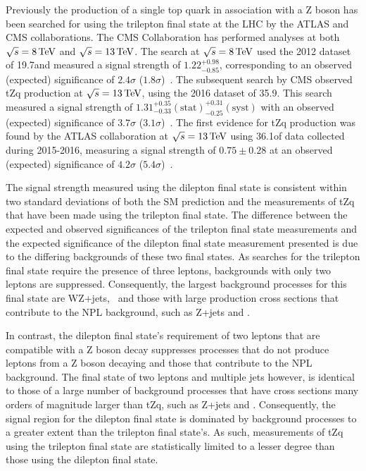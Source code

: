 Previously the production of a single top quark in association with a Z boson has been searched for using the trilepton final state at the LHC by the ATLAS and CMS collaborations.
The CMS Collaboration has performed analyses at both $\sqrt{s} = 8 \,\text{Te\hspace{-.08em}V}$ and $\sqrt{s} = 13 \,\text{Te\hspace{-.08em}V}$.
The search at $\sqrt{s} = 8 \,\text{Te\hspace{-.08em}V}$ used the 2012 dataset of 19.7\fbinv and measured a signal strength of $1.22^{+0.98}_{-0.85}$, corresponding to an observed (expected) significance of $2.4 \sigma$ ($1.8\sigma$)~\cite{Sirunyan:2017kkr}.
The subsequent search by CMS observed tZq production at $\sqrt{s} = 13 \,\text{Te\hspace{-.08em}V}$, using the 2016 dataset of 35.9\fbinv. 
This search measured a signal strength of $1.31^{+0.35}_{-0.33} (\textrm{stat}) ^{+0.31}_{-0.25}(\textrm{syst})$ with an observed (expected) significance of $3.7 \sigma$ ($3.1\sigma$)~\cite{Sirunyan:2017nbr}.
The first evidence for tZq production was found by the ATLAS collaboration at $\sqrt{s} = 13 \,\text{Te\hspace{-.08em}V}$ using 36.1\fbinv of data collected during 2015-2016, measuring a signal strength of $0.75 \pm 0.28$ at an observed (expected) significance of $4.2\sigma$ ($5.4\sigma$)~\cite{Aaboud:2017ylb}.

The signal strength measured using the dilepton final state is consistent within two standard deviations of both the SM prediction and the measurements of tZq that have been made using the trilepton final state.
The difference between the expected and observed significances of the trilepton final state  measurements and the expected significance of the dilepton final state measurement presented is due to the differing backgrounds of these two final states.
As searches for the trilepton final state require the presence of three leptons, backgrounds with only two leptons are suppressed.
Consequently, the largest background processes for this final state are WZ+jets, \ttZ~and those with large production cross sections that contribute to the NPL background, such as Z+jets and \ttbar.

In contrast, the dilepton final state's requirement of two leptons that are compatible with a Z boson decay suppresses processes that do not produce leptons from a Z boson decaying and those that contribute to the NPL background.
The final state of two leptons and multiple jets however, is identical to those of a large number of background processes that have cross sections many orders of magnitude larger than tZq, such as Z+jets and \ttbar.
Consequently, the signal region for the dilepton final state is dominated by background processes to a greater extent than the trilepton final state's.
As such, measurements of tZq using the trilepton final state are statistically limited to a lesser degree than those using the dilepton final state.